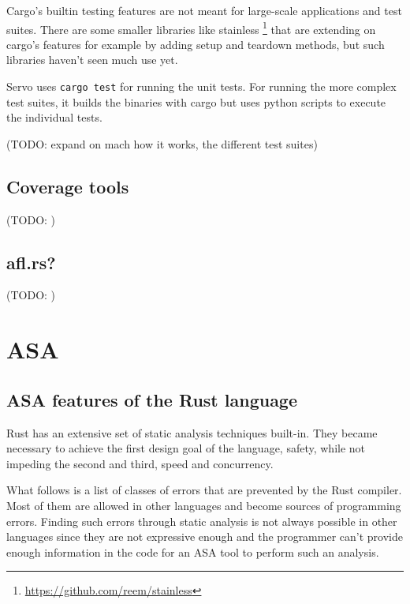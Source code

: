 \documentclass{scrartcl}
\newcommand{\todo}[1] {{\color{red}(TODO: #1)}}
\begin{document}
Cargo's builtin testing features are not meant for large-scale applications and test suites. There are some smaller libraries like stainless \footnote{\url{https://github.com/reem/stainless}} that are extending on cargo's features for example by adding setup and teardown methods, but such libraries haven't seen much use yet. 

Servo uses \texttt{cargo test} for running the unit tests. For running the more complex test suites, it builds the binaries with cargo but uses python scripts to execute the individual tests.

\todo{expand on mach how it works, the different test suites}


\subsection{Coverage tools}
\todo{}

\subsection{afl.rs?}
\todo{}





\section{ASA}



\subsection{ASA features of the Rust language} \label{rust_features}

Rust has an extensive set of static analysis techniques built-in. They became necessary to achieve the first design goal of the language, safety, while not impeding the second and third, speed and concurrency.

What follows is a list of classes of errors that are prevented by the Rust compiler. Most of them are allowed in other languages and become sources of programming errors. Finding such errors through static analysis is not always possible in other languages since they are not expressive enough and the programmer can't provide enough information in the code for an ASA tool to perform such an analysis.
\end{document}
